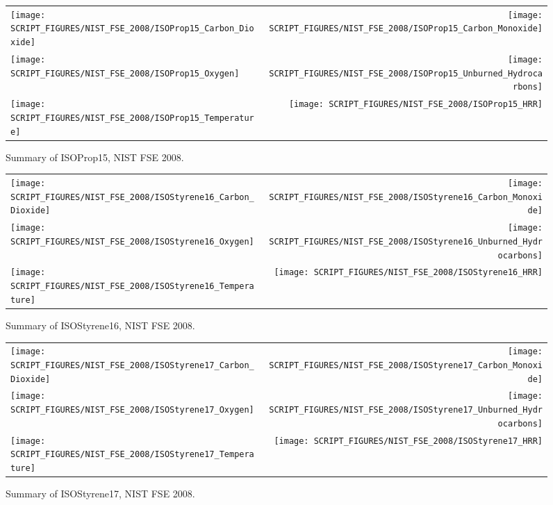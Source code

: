 \begin{figure}[h]
\begin{tabular*}{\textwidth}{l@{\extracolsep{\fill}}r}
\texttt{[image: SCRIPT\_FIGURES/NIST\_FSE\_2008/ISOProp15\_Carbon\_Dioxide]} &
\texttt{[image: SCRIPT\_FIGURES/NIST\_FSE\_2008/ISOProp15\_Carbon\_Monoxide]} \\
\texttt{[image: SCRIPT\_FIGURES/NIST\_FSE\_2008/ISOProp15\_Oxygen]} &
\texttt{[image: SCRIPT\_FIGURES/NIST\_FSE\_2008/ISOProp15\_Unburned\_Hydrocarbons]} \\
\texttt{[image: SCRIPT\_FIGURES/NIST\_FSE\_2008/ISOProp15\_Temperature]} &
\texttt{[image: SCRIPT\_FIGURES/NIST\_FSE\_2008/ISOProp15\_HRR]}
\end{tabular*}
\caption[Summary of ISOProp15, NIST FSE 2008]{Summary of ISOProp15, NIST FSE 2008.}
\label{NIST_FSE_1994_ISOProp15}
\end{figure}

\begin{figure}[h]
\begin{tabular*}{\textwidth}{l@{\extracolsep{\fill}}r}
\texttt{[image: SCRIPT\_FIGURES/NIST\_FSE\_2008/ISOStyrene16\_Carbon\_Dioxide]} &
\texttt{[image: SCRIPT\_FIGURES/NIST\_FSE\_2008/ISOStyrene16\_Carbon\_Monoxide]} \\
\texttt{[image: SCRIPT\_FIGURES/NIST\_FSE\_2008/ISOStyrene16\_Oxygen]} &
\texttt{[image: SCRIPT\_FIGURES/NIST\_FSE\_2008/ISOStyrene16\_Unburned\_Hydrocarbons]} \\
\texttt{[image: SCRIPT\_FIGURES/NIST\_FSE\_2008/ISOStyrene16\_Temperature]} &
\texttt{[image: SCRIPT\_FIGURES/NIST\_FSE\_2008/ISOStyrene16\_HRR]}
\end{tabular*}
\caption[Summary of ISOStyrene16, NIST FSE 2008]{Summary of ISOStyrene16, NIST FSE 2008.}
\label{NIST_FSE_1994_ISOStyrene16}
\end{figure}

\begin{figure}[h]
\begin{tabular*}{\textwidth}{l@{\extracolsep{\fill}}r}
\texttt{[image: SCRIPT\_FIGURES/NIST\_FSE\_2008/ISOStyrene17\_Carbon\_Dioxide]} &
\texttt{[image: SCRIPT\_FIGURES/NIST\_FSE\_2008/ISOStyrene17\_Carbon\_Monoxide]} \\
\texttt{[image: SCRIPT\_FIGURES/NIST\_FSE\_2008/ISOStyrene17\_Oxygen]} &
\texttt{[image: SCRIPT\_FIGURES/NIST\_FSE\_2008/ISOStyrene17\_Unburned\_Hydrocarbons]} \\
\texttt{[image: SCRIPT\_FIGURES/NIST\_FSE\_2008/ISOStyrene17\_Temperature]} &
\texttt{[image: SCRIPT\_FIGURES/NIST\_FSE\_2008/ISOStyrene17\_HRR]}
\end{tabular*}
\caption[Summary of ISOStyrene17, NIST FSE 2008]{Summary of ISOStyrene17, NIST FSE 2008.}
\label{NIST_FSE_1994_ISOStyrene17}
\end{figure}

